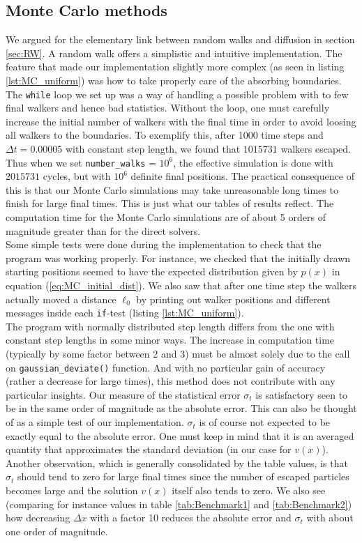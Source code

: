 \documentclass[a4paper, 11pt, notitlepage,english]{article}
\begin{document}
\subsection{Monte Carlo methods}
We argued for the elementary link between random walks and diffusion in section \ref{sec:RW}. A random walk offers a simplistic and intuitive implementation. The feature that made our implementation slightly more complex (as seen in listing \ref{lst:MC_uniform}) was how to take properly care of the absorbing boundaries. The \texttt{while} loop we set up was a way of handling a possible problem with to few final walkers and hence bad statistics. Without the loop, one must carefully increase the initial number of walkers with the final time in order to avoid loosing all walkers to the boundaries. To exemplify this, after 1000 time steps and $\Delta t = 0.00005$ with constant step length, we found that $1 015 731$ walkers escaped. Thus when we set \texttt{number\_walks} = $10^6$, the effective simulation is done with $2 015 731$ cycles, but with $10^6$ definite final positions. The practical consequence of this is that our Monte Carlo simulations may take unreasonable long times to finish for large final times. This is just what our tables of results reflect. The computation time for the Monte Carlo simulations are of about 5 orders of magnitude greater than for the direct solvers. \\

Some simple tests were done during the implementation to check that the program was working properly. For instance, we checked that the initially drawn starting positions seemed to have the expected distribution given by $p(x)$ in equation (\ref{eq:MC_initial_dist}). We also saw that after one time step the walkers actually moved a distance $\ell_0$ by printing out walker positions and different messages inside each \texttt{if}-test (listing \ref{lst:MC_uniform}). \\

The program with normally distributed step length differs from the one with constant step lengths in some minor ways. The increase in computation time (typically by some factor between 2 and 3) must be almost solely due to the call on \texttt{gaussian\_deviate()} function. And with no particular gain of accuracy (rather a decrease for large times), this method does not contribute with any particular insights. Our measure of the statistical error $\sigma_t$ is satisfactory seen to be in the same order of magnitude as the absolute error. This can also be thought of as a simple test of our implementation. $\sigma_t$ is of course not expected to be exactly equal to the absolute error. One must keep in mind that it is an averaged quantity that approximates the standard deviation (in our case for $v(x)$). Another observation, which is generally consolidated by the table values, is that $\sigma_t$ should tend to zero for large final times since the number of escaped particles becomes large and the solution $v(x)$ itself also tends to zero. We also see (comparing for instance values in table \ref{tab:Benchmark1} and \ref{tab:Benchmark2}) how decreasing $\Delta x$ with a factor 10 reduces the absolute error and $\sigma_t$ with about one order of magnitude. \\
\end{document}
